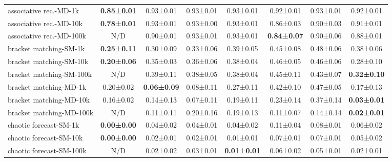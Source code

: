 \documentclass{article}
\begin{document}
\begin{table}[H]
{\begin{tabular}{lccccccc}
    associative rec.-MD-1k               & \textbf{0.85±0.01}  & 0.93±0.01      & 0.93±0.01      & 0.93±0.01      & 0.92±0.01            & 0.93±0.01           & 0.92±0.01      \\
    associative rec.-MD-10k              & \textbf{0.78±0.01}  & 0.93±0.01      & 0.93±0.00      & 0.93±0.01      & 0.86±0.03            & 0.90±0.03           & 0.91±0.01      \\
    associative rec.-MD-100k             & N/D              & 0.90±0.01      & 0.93±0.01      & 0.93±0.01      & \textbf{0.84±0.07}        & 0.90±0.06           & 0.88±0.01      \\
    bracket matching-SM-1k                 & \textbf{0.25±0.11}  & 0.30±0.09      & 0.33±0.06      & 0.39±0.05      & 0.45±0.08            & 0.48±0.06           & 0.38±0.06      \\
    bracket matching-SM-10k                & \textbf{0.20±0.06}  & 0.35±0.03      & 0.36±0.06      & 0.38±0.04      & 0.46±0.05            & 0.46±0.06           & 0.28±0.10      \\
    bracket matching-SM-100k               & N/D              & 0.39±0.11      & 0.38±0.05      & 0.38±0.04      & 0.45±0.11            & 0.43±0.07           & \textbf{0.32±0.10}  \\
    bracket matching-MD-1k                 & 0.20±0.02      & \textbf{0.06±0.09}  & 0.08±0.11      & 0.27±0.11      & 0.42±0.10            & 0.47±0.05           & 0.17±0.13      \\
    bracket matching-MD-10k                & 0.16±0.02      & 0.14±0.13      & 0.07±0.11      & 0.19±0.11      & 0.23±0.14            & 0.37±0.14           & \textbf{0.03±0.01}  \\
    bracket matching-MD-100k               & N/D              & 0.11±0.11      & 0.20±0.16      & 0.19±0.13      & 0.11±0.07            & 0.14±0.14           & \textbf{0.02±0.01}  \\
    chaotic forecast-SM-1k              & \textbf{0.00±0.00}  & 0.04±0.02      & 0.04±0.01      & 0.04±0.02      & 0.11±0.04            & 0.08±0.01           & 0.06±0.02      \\
    chaotic forecast-SM-10k             & \textbf{0.00±0.00}  & 0.02±0.01      & 0.02±0.01      & 0.01±0.01      & 0.07±0.01            & 0.07±0.01           & 0.05±0.02      \\
    chaotic forecast-SM-100k            & N/D              & 0.02±0.02      & 0.03±0.01      & \textbf{0.01±0.01}  & 0.06±0.02            & 0.05±0.01           & 0.02±0.01      \\

\end{tabular}}
\end{table}
\end{document}
